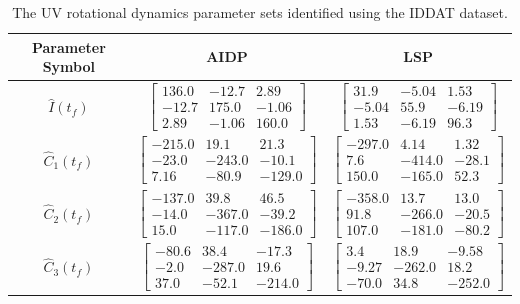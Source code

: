 \begin{table}[htbp]
\ssp
\caption{The \ac{UV} rotational dynamics parameter sets identified
  using the \ac{IDDAT} dataset.}
\begin{center}
\begin{tabular}{c|cc}
Parameter Symbol & \ac{AIDP} & \ac{LSP} \\ \hline
$\hat{I}(t_f)$ &
$ \left[\begin{array}{ccc} 136.0 & -12.7 & 2.89\\ -12.7 & 175.0 & -1.06\\ 2.89 & -1.06 & 160.0 \end{array}\right] $
&
$ \left[\begin{array}{ccc} 31.9 & -5.04 & 1.53\\ -5.04 & 55.9 & -6.19\\ 1.53 & -6.19 & 96.3 \end{array}\right] $
\\
$\hat{C}_1(t_f)$ &
$ \left[\begin{array}{ccc} -215.0 & 19.1 & 21.3\\ -23.0 & -243.0 & -10.1\\ 7.16 & -80.9 & -129.0 \end{array}\right] $
&
$ \left[\begin{array}{ccc} -297.0 & 4.14 & 1.32\\ 7.6 & -414.0 & -28.1\\ 150.0 & -165.0 & 52.3 \end{array}\right] $
\\
$\hat{C}_2(t_f)$ &
$ \left[\begin{array}{ccc} -137.0 & 39.8 & 46.5\\ -14.0 & -367.0 & -39.2\\ 15.0 & -117.0 & -186.0 \end{array}\right] $
&
$ \left[\begin{array}{ccc} -358.0 & 13.7 & 13.0\\ 91.8 & -266.0 & -20.5\\ 107.0 & -181.0 & -80.2 \end{array}\right] $
\\
$\hat{C}_3(t_f)$ &
$ \left[\begin{array}{ccc} -80.6 & 38.4 & -17.3\\ -2.0 & -287.0 & 19.6\\ 37.0 & -52.1 & -214.0 \end{array}\right] $
&
$ \left[\begin{array}{ccc} 3.4 & 18.9 & -9.58\\ -9.27 & -262.0 & 18.2\\ -70.0 & 34.8 & -252.0 \end{array}\right] $

\end{tabular}
\end{center}
\end{table}
